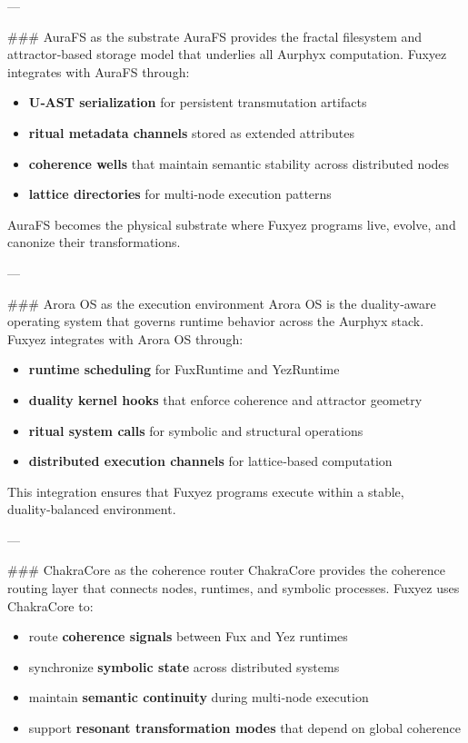 \begin{enumerate}
---

\#\#\# AuraFS as the substrate  
AuraFS provides the fractal filesystem and attractor‑based storage model that underlies all Aurphyx computation. Fuxyez integrates with AuraFS through:

\begin{itemize}
  \item \textbf{U‑AST serialization} for persistent transmutation artifacts  
  \item \textbf{ritual metadata channels} stored as extended attributes  
  \item \textbf{coherence wells} that maintain semantic stability across distributed nodes  
  \item \textbf{lattice directories} for multi‑node execution patterns  
\end{itemize}

AuraFS becomes the physical substrate where Fuxyez programs live, evolve, and canonize their transformations.

---

\#\#\# Arora OS as the execution environment  
Arora OS is the duality‑aware operating system that governs runtime behavior across the Aurphyx stack. Fuxyez integrates with Arora OS through:

\begin{itemize}
  \item \textbf{runtime scheduling} for FuxRuntime and YezRuntime  
  \item \textbf{duality kernel hooks} that enforce coherence and attractor geometry  
  \item \textbf{ritual system calls} for symbolic and structural operations  
  \item \textbf{distributed execution channels} for lattice‑based computation  
\end{itemize}

This integration ensures that Fuxyez programs execute within a stable, duality‑balanced environment.

---

\#\#\# ChakraCore as the coherence router  
ChakraCore provides the coherence routing layer that connects nodes, runtimes, and symbolic processes. Fuxyez uses ChakraCore to:

\begin{itemize}
  \item route \textbf{coherence signals} between Fux and Yez runtimes  
  \item synchronize \textbf{symbolic state} across distributed systems  
  \item maintain \textbf{semantic continuity} during multi‑node execution  
  \item support \textbf{resonant transformation modes} that depend on global coherence  
\end{itemize}


\end{enumerate}
